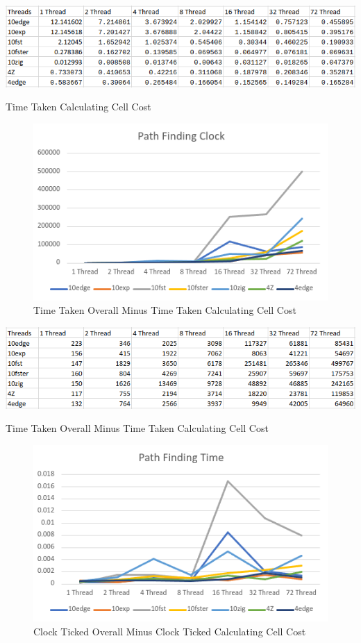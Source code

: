 \documentclass{article}
\begin{document}
\begin{table}[!htb]
\includegraphics[width=\textwidth]{cell-cost-time-table.png}
\caption{Time Taken Calculating Cell Cost}
\label{tab:4}
\end{table}

\begin{figure}[!htb]
\includegraphics[width=\textwidth]{path-finding-clock.png}
\caption{Time Taken Overall Minus Time Taken Calculating Cell Cost}
\label{fig:5}
\end{figure}

\begin{table}[!htb]
\includegraphics[width=\textwidth]{path-finding-clock-table.png}
\caption{Time Taken Overall Minus Time Taken Calculating Cell Cost}
\label{tab:5}
\end{table}

\begin{figure}[!htb]
\includegraphics[width=\textwidth]{path-finding-time.png}
\caption{Clock Ticked Overall Minus Clock Ticked Calculating Cell Cost}
\label{fig:6}
\end{figure}
\end{document}
